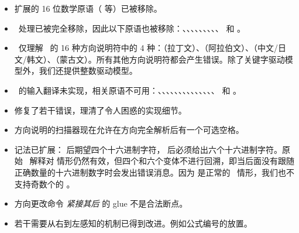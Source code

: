 \begin{itemize}\item 扩展的 16 位数学原语（ 等）已被移除。

\item \OCP\ 处理已被完全移除，因此以下原语也被移除：、、、、、、、、、 和 。

\item \LUATEX\ 仅理解 \ALEPH\ 的 16 种方向说明符中的 4 种：（拉丁文）、（阿拉伯文）、（中文/日文/韩文）、（蒙古文）。所有其他方向说明符都会产生错误。除了关键字驱动模型外，我们还提供整数驱动模型。

\item \ALEPH\ 的输入翻译未实现，相关原语不可用：、、、、、、、、、、、、、、 和 。

\item 修复了若干错误，理清了令人困惑的实现细节。

\item 方向说明的扫描器现在允许在方向完全解析后有一个可选空格。

\item \type {\textasciicircum\textasciicircum{}} 记法已扩展：\type {\textasciicircum\textasciicircum{}\textasciicircum\textasciicircum{}} 后期望四个十六进制字符，\type {\textasciicircum\textasciicircum{}\textasciicircum\textasciicircum{}\textasciicircum\textasciicircum{}} 后必须给出六个十六进制字符。原始 \TEX\ 解释对 \type {\textasciicircum\textasciicircum{}} 情形仍然有效，但四个和六个变体不进行回溯，即当后面没有跟随正确数量的十六进制数字时会发出错误消息。因为 \type{\textasciicircum\textasciicircum{}^} 是正常的 \TEX\ 情形，我们也不支持奇数个的 \type {\textasciicircum\textasciicircum{}\textasciicircum\textasciicircum{}^}。

\item 方向更改命令 {\it 紧接其后} 的 glue 不是合法断点。

\item 若干需要从右到左感知的机制已得到改进。例如公式编号的放置。


\end{itemize}
